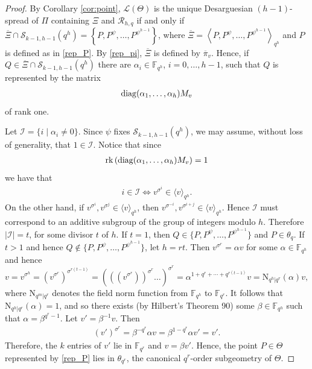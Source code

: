 \documentclass[11pt]{article}
\theoremstyle{definition}
\numberwithin{equation}{section}
\def\cI{\mathcal I}
\def\cL{\mathcal L}
\def\cR{\mathcal R}
\def\cS{\mathcal S}
\def\F{{\mathbb F}}
\def\N{{\mathrm N}}
\def\diag{{\rm diag}}
\def\rk{{\rm rk}}
\begin{document}
\begin{proof}
By Corollary \ref{cor:point}, $\cL(\Theta)$ is the unique Desarguesian $(h-1)$-spread of $\Pi$ containing $\Xi$ and $\cR_{h, q}$ if and only if $\overline{\Xi} \cap \cS_{k-1, h-1}(q^h) = \left\{P, P^\psi, \dots, P^{\psi^{h-1}} \right\}$, where $\overline{\Xi} = \left\langle P, P^{\psi}, \dots, P^{\psi^{h-1}} \right\rangle_{q^h}$ and $P$ is defined as in \eqref{rep_P}. By \eqref{rep_pi}, $\overline{\Xi}$ is defined by $\overline{\pi}_v$. Hence, if $Q \in \overline{\Xi} \cap \cS_{k-1, h-1}(q^h)$ there are $\alpha_i \in \F_{q^h}$, $i = 0, \dots, h-1$, such that $Q$ is represented by the matrix  
\begin{align*}
\diag(\alpha_1, \dots, \alpha_{h}) M_v    
\end{align*}
of rank one. 

Let $\cI= \{i \mid \alpha_i \ne 0\}$. Since $\psi$ fixes $\cS_{k-1, h-1}(q^h)$, we may assume, without loss of generality,  that $1 \in \cI$. Notice that since 
\begin{align*}
\rk\left(\diag(\alpha_1, \dots, \alpha_{h}) M_v\right) = 1
\end{align*}
we have that
\begin{align*}
i \in \cI \iff v^{\sigma^i}\in \langle v \rangle_{q^h}.
\end{align*}
On the other hand, if $v^{\sigma^i},v^{\sigma^j} \in \langle v \rangle_{q^h}$, then $v^{\sigma^{-i}},v^{\sigma^{i+j}}\in \langle v \rangle_{q^h}$.
Hence $\cI$ must correspond to an additive subgroup of the group of integers modulo $h$. Therefore $|\cI| = t$, for some divisor $t$ of $h$. If $t = 1$, then $Q \in \{P, P^\psi, \dots, P^{\psi^{h-1}}\}$ and $P \in \theta_q$. If $t > 1$ and hence $Q \notin \{P, P^\psi, \dots, P^{\psi^{h-1}}\}$, let $h = rt$. Then $v^{\sigma^r} = \alpha v$ for some $\alpha \in \F_{q^h}$ and hence 
\[ v = v^{\sigma^h} = (v^{\sigma^r})^{\sigma^{r(t-1)}} =  \left(\left((v^{\sigma^r})\right)^{\sigma^r}\dots\right)^{\sigma^r} = \alpha^{1+q^r+\cdots+q^{r(t-1)}}v = \N_{q^h|q^r}(\alpha) v,
\]
where $\N_{q^m|q^r}$ denotes the field norm function from $\F_{q^h}$ to $\F_{q^r}$. It follows that $\N_{q^h|q^r}(\alpha)=1$, and so there exists (by Hilbert's Theorem 90) some $\beta \in \F_{q^h}$ such that $\alpha = \beta^{q^r-1}$. Let $v'=\beta^{-1} v$. Then 
\begin{align*}
(v')^{\sigma^r} = \beta^{-q^r} \alpha v = \beta^{1-q^r} \alpha v'=v'.
\end{align*}
Therefore, the $k$ entries of $v'$ lie in $\F_{q^r}$ and $v= \beta v'$. Hence, the point $P \in \Theta$ represented by \eqref{rep_P} lies in $\theta_{q^r}$, the canonical $q^r$-order subgeometry of $\Theta$. 
\end{proof}
\end{document}
